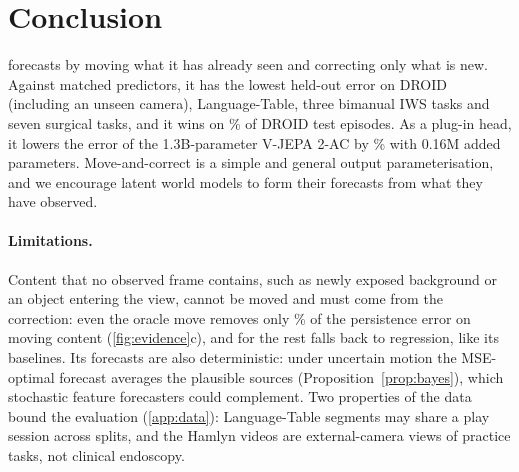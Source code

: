 \section{Conclusion}
\label{sec:conclusion}
\ours{} forecasts by moving what it has already seen and correcting only what is new.
%
Against matched predictors, it has the lowest held-out error on DROID (including an unseen camera), Language-Table, three
bimanual IWS tasks and seven surgical tasks, and it wins on \wmWinDirect\% of DROID test episodes.
%
As a plug-in head, it lowers the error of the 1.3B-parameter V-JEPA 2-AC by \vjepaMSERed\% with 0.16M added parameters.
%
Move-and-correct is a simple and general output parameterisation, and we encourage latent world models to form their
forecasts from what they have observed.

\paragraph{Limitations.} Content that no observed frame contains, such as newly exposed background or an object
entering the view, cannot be moved and must come from the correction: even the oracle move removes only
\geoOracleRed\% of the persistence error on moving content (\cref{fig:evidence}c), and for the rest \ours{} falls back to regression,
like its baselines.
%
Its forecasts are also deterministic: under uncertain motion the MSE-optimal forecast averages the plausible sources
(Proposition~\ref{prop:bayes}), which stochastic feature forecasters \citep{boduljak2025vfmf,porcher2026flowwm} could
complement.
%
Two properties of the data bound the evaluation (\cref{app:data}): Language-Table segments may share a play session
across splits, and the Hamlyn videos are external-camera views of practice tasks, not clinical endoscopy.

